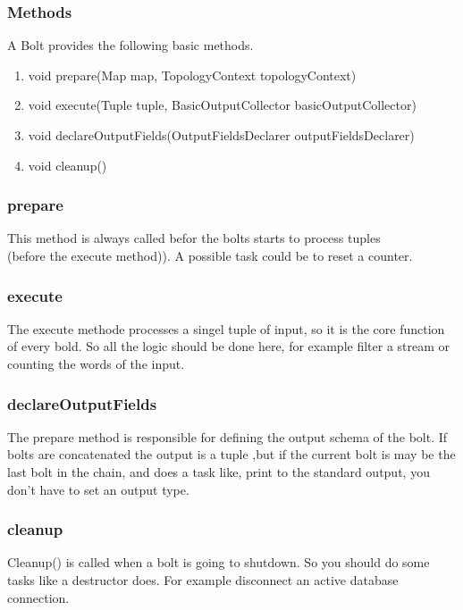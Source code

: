 \subsubsection{Methods}
A Bolt provides the following basic methods.
\begin{enumerate}
    \item void prepare(Map map, TopologyContext topologyContext)
    \item void execute(Tuple tuple, BasicOutputCollector basicOutputCollector)
    \item void declareOutputFields(OutputFieldsDeclarer outputFieldsDeclarer)
    \item void cleanup()
\end{enumerate}

\subsubsection{prepare}
This method is always called befor the bolts starts to process tuples\\ (before the execute method)).
A possible task could be to reset a counter.


\subsubsection{execute}
The execute methode processes a singel tuple of input, so it is the core function of every bold.
So all the logic should be done here, for example filter a stream or counting the words of the input.

\subsubsection{declareOutputFields}
The prepare method is responsible for defining the output schema of the bolt.
If bolts are concatenated the output is a tuple ,but if the current bolt is may be the last bolt in the chain,
and does a task like, print to the standard output, you don't have to set an output type.

\subsubsection{cleanup}
Cleanup() is called when a bolt is going to shutdown. So you should do some tasks like a destructor does.
For example disconnect an active database connection.

